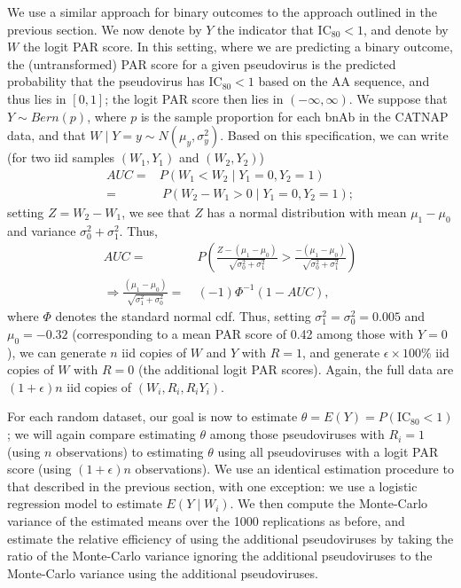 \documentclass[10pt]{article}
\begin{document}
We use a similar approach for binary outcomes to the approach outlined in the previous section. We now denote by $Y$ the indicator that IC$_{80} < 1$, and denote by $W$ the logit PAR score. In this setting, where we are predicting a binary outcome, the (untransformed) PAR score for a given pseudovirus is the predicted probability that the pseudovirus has IC$_{80} < 1$ based on the AA sequence, and thus lies in $[0,1]$; the logit PAR score then lies in $(-\infty, \infty)$. We suppose that $Y \sim Bern(p)$, where $p$ is the sample proportion for each bnAb in the CATNAP data, and that $W \mid Y = y \sim N(\mu_y, \sigma^2_y)$. Based on this specification, we can write (for two iid samples $(W_1, Y_1)$ and $(W_2, Y_2)$)
\begin{align*}
    AUC =& P(W_1 < W_2 \mid Y_1 = 0, Y_2 = 1) \\
    =& \ P(W_2 - W_1 > 0 \mid Y_1 = 0, Y_2 = 1);
\end{align*}
setting $Z = W_2 - W_1$, we see that $Z$ has a normal distribution with mean $\mu_1 - \mu_0$ and variance $\sigma^2_0 + \sigma^2_1$. Thus,
\begin{align*}
    AUC =& \ P\left(\frac{Z - (\mu_1 - \mu_0)}{\sqrt{\sigma^2_0 + \sigma^2_1}} > \frac{- (\mu_1 - \mu_0)}{\sqrt{\sigma^2_0 + \sigma^2_1}}\right) \\
    \Rightarrow \frac{(\mu_1 - \mu_0)}{\sqrt{\sigma^2_1 + \sigma^2_0}} =& \ (-1)\Phi^{-1}(1 - AUC),
\end{align*}
where $\Phi$ denotes the standard normal cdf. Thus, setting $\sigma^2_1 = \sigma^2_0 = 0.005$ and $\mu_0 = -0.32$ (corresponding to a mean PAR score of 0.42 among those with $Y = 0$), we can generate $n$ iid copies of $W$ and $Y$ with $R = 1$, and generate $\epsilon \times 100$\% iid copies of $W$ with $R = 0$ (the additional logit PAR scores). Again, the full data are $(1 + \epsilon)n$ iid copies of $(W_i, R_i, R_iY_i)$.

For each random dataset, our goal is now to estimate $\theta = E(Y) = P(\text{IC}_{80} < 1)$; we will again compare estimating $\theta$ among those pseudoviruses with $R_i = 1$ (using $n$ observations) to estimating $\theta$ using all pseudoviruses with a logit PAR score (using $(1+\epsilon)n$ observations). We use an identical estimation procedure to that described in the previous section, with one exception: we use a logistic regression model to estimate $E(Y \mid W_i)$. We then compute the Monte-Carlo variance of the estimated means over the 1000 replications as before, and estimate the relative efficiency of using the additional pseudoviruses by taking the ratio of the Monte-Carlo variance ignoring the additional pseudoviruses to the Monte-Carlo variance using the additional pseudoviruses.
\end{document}
